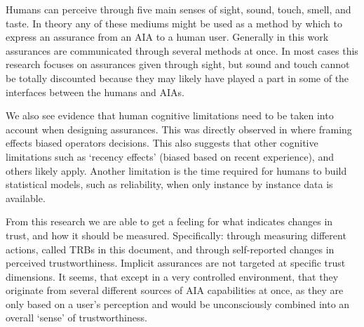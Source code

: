 Humans can perceive through five main senses of sight, sound, touch, smell, and taste. In theory any of these mediums might be used as a method by which to express an assurance from an AIA to a human user. Generally in this work assurances are communicated through several methods at once. In most cases this research focuses on assurances given through sight, but sound and touch cannot be totally discounted because they may likely have played a part in some of the interfaces between the humans and AIAs. 

We also see evidence that human cognitive limitations need to be taken into account when designing assurances. This was directly observed in \cite{Freedy2007-sg,Riley1996-qm} where framing effects biased operators decisions. This also suggests that other cognitive limitations such as `recency effects' (biased based on recent experience), and others likely apply. Another limitation is the time required for humans to build statistical models, such as reliability, when only instance by instance data is available.

From this research we are able to get a feeling for what indicates changes in trust, and how it should be measured. Specifically: through measuring different actions, called TRBs in this document, and through self-reported changes in perceived trustworthiness. Implicit assurances are not targeted at specific trust dimensions. It seems, that except in a very controlled environment, that they originate from several different sources of AIA capabilities at once, as they are only based on a user's perception and would be unconsciously combined into an overall `sense' of trustworthiness.
